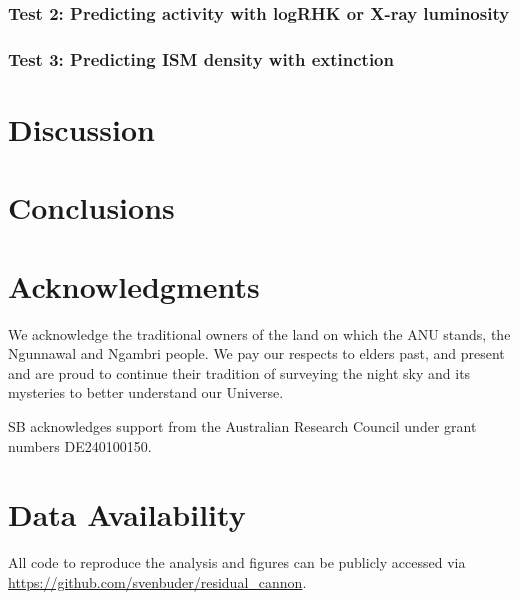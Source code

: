 \documentclass[twocolumn,apj,numberedappendix,appendixfloats]{openjournal}
\begin{document}
\subsubsection{Test 2: Predicting activity with logRHK or X-ray luminosity}


\subsubsection{Test 3: Predicting ISM density with extinction}


\section{Discussion} \label{sec:discussion}

\section{Conclusions} \label{sec:conclusions}


\section*{Acknowledgments}

We acknowledge the traditional owners of the land on which the ANU stands, the Ngunnawal and Ngambri people. We pay our respects to elders past, and present and are proud to continue their tradition of surveying the night sky and its mysteries to better understand our Universe.

SB acknowledges support from the Australian Research Council under grant numbers DE240100150.

\section*{Data Availability}

All code to reproduce the analysis and figures can be publicly accessed via \url{https://github.com/svenbuder/residual_cannon}.






\end{document}
